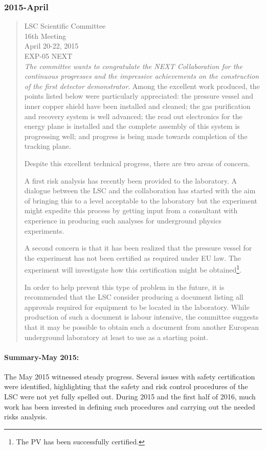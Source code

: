 \subsubsection*{2015-April}
\begin{quotation}

LSC Scientific Committee \\
16th Meeting\\
April 20-22, 2015\\
EXP-05  NEXT  \\

{\em The committee wants to congratulate the NEXT Collaboration for the continuous progresses and the impressive achievements on the construction of the first detector demonstrator}. Among the excellent work produced, the points listed below were particularly appreciated: the pressure vessel and inner copper shield have been installed and cleaned; the gas purification and recovery system is well advanced; the read out electronics for the energy plane is installed and the complete assembly of this system is progressing well; and progress is being made towards completion of the tracking plane.

Despite this excellent technical progress, there are two areas of concern. 

A first risk analysis has recently been provided to the laboratory. A dialogue between the LSC and the collaboration has started with the aim of bringing this to a level acceptable to the laboratory but the experiment might expedite this process by getting input from a consultant with experience in producing such analyses for underground physics experiments.

A second concern is that it has been realized that the pressure vessel for the experiment has not been certified as required under EU law. The experiment will investigate how this certification might be obtained\footnote{The PV has been successfully certified.}.

In order to help prevent this type of problem in the future, it is recommended that the LSC consider producing a document listing all approvals required for equipment to be located in the laboratory. While production of such a document is labour intensive, the committee suggests that it may be possible to obtain such a document from another European underground laboratory at least to use as a starting point.

\end{quotation}
\paragraph{Summary-May 2015:} The May 2015 witnessed steady progress. Several issues with safety certification were identified, highlighting that the safety and risk control procedures of the LSC were not yet fully spelled out. During 2015 and the first half of 2016, much work has been invested in defining such procedures and carrying out the needed risks analysis. 

